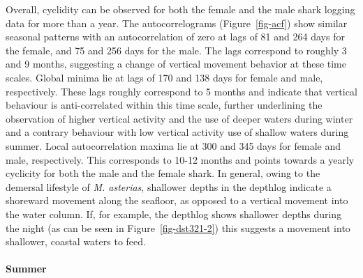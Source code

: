 \documentclass[
  authoryear,
  review,
  3p]{elsarticle}
\let\oldparagraph\paragraph
\renewcommand{\paragraph}[1]{\oldparagraph{#1}\mbox{}}
\begin{document}
Overall, cyclidity can be observed for both the female and the male
shark logging data for more than a year. The autocorrelograms
(Figure~\ref{fig-acf}) show similar seasonal patterns with an
autocorrelation of zero at lags of 81 and 264 days for the female, and
75 and 256 days for the male. The lags correspond to roughly 3 and 9
months, suggesting a change of vertical movement behavior at these time
scales. Global minima lie at lags of 170 and 138 days for female and
male, respectively. These lags roughly correspond to 5 months and
indicate that vertical behaviour is anti-correlated within this time
scale, further underlining the observation of higher vertical activity
and the use of deeper waters during winter and a contrary behaviour with
low vertical activity use of shallow waters during summer. Local
autocorrelation maxima lie at 300 and 345 days for female and male,
respectively. This corresponds to 10-12 months and points towards a
yearly cyclicity for both the male and the female shark. In general,
owing to the demersal lifestyle of \emph{M. asterias}, shallower depths
in the depthlog indicate a shoreward movement along the seafloor, as
opposed to a vertical movement into the water column. If, for example,
the depthlog shows shallower depths during the night (as can be seen in
Figure~\ref{fig-dst321-2}) this suggests a movement into shallower,
coastal waters to feed.

\hypertarget{summer}{%
\paragraph{Summer}\label{summer}}
\end{document}

